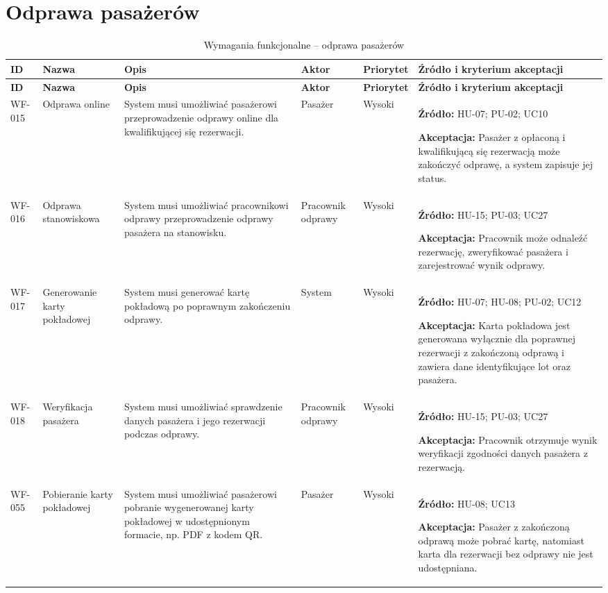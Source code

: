 \documentclass[12pt,a4paper,oneside]{report}
\begin{document}
\section{Odprawa pasażerów}
\small
\begin{longtable}{|p{1.05cm}|p{2.15cm}|p{3.35cm}|p{1.75cm}|p{0.95cm}|p{4.05cm}|}
\caption{Wymagania funkcjonalne -- odprawa pasażerów}\\\hline
\rowcolor{lightblue}\textbf{ID} & \textbf{Nazwa} & \textbf{Opis} & \textbf{Aktor} & \textbf{Priorytet} & \textbf{Źródło i kryterium akceptacji}\\\hline
\endfirsthead
\hline
\rowcolor{lightblue}\textbf{ID} & \textbf{Nazwa} & \textbf{Opis} & \textbf{Aktor} & \textbf{Priorytet} & \textbf{Źródło i kryterium akceptacji}\\\hline
\endhead
WF-015 & Odprawa online & System musi umożliwiać pasażerowi przeprowadzenie odprawy online dla kwalifikującej się rezerwacji. & Pasażer & Wysoki & \textbf{Źródło:} HU-07; PU-02; UC10\par\textbf{Akceptacja:} Pasażer z opłaconą i kwalifikującą się rezerwacją może zakończyć odprawę, a system zapisuje jej status.\\\hline
WF-016 & Odprawa stanowiskowa & System musi umożliwiać pracownikowi odprawy przeprowadzenie odprawy pasażera na stanowisku. & Pracownik odprawy & Wysoki & \textbf{Źródło:} HU-15; PU-03; UC27\par\textbf{Akceptacja:} Pracownik może odnaleźć rezerwację, zweryfikować pasażera i zarejestrować wynik odprawy.\\\hline
WF-017 & Generowanie karty pokładowej & System musi generować kartę pokładową po poprawnym zakończeniu odprawy. & System & Wysoki & \textbf{Źródło:} HU-07; HU-08; PU-02; UC12\par\textbf{Akceptacja:} Karta pokładowa jest generowana wyłącznie dla poprawnej rezerwacji z zakończoną odprawą i zawiera dane identyfikujące lot oraz pasażera.\\\hline
WF-018 & Weryfikacja pasażera & System musi umożliwiać sprawdzenie danych pasażera i jego rezerwacji podczas odprawy. & Pracownik odprawy & Wysoki & \textbf{Źródło:} HU-15; PU-03; UC27\par\textbf{Akceptacja:} Pracownik otrzymuje wynik weryfikacji zgodności danych pasażera z rezerwacją.\\\hline
WF-055 & Pobieranie karty pokładowej & System musi umożliwiać pasażerowi pobranie wygenerowanej karty pokładowej w udostępnionym formacie, np. PDF z kodem QR. & Pasażer & Wysoki & \textbf{Źródło:} HU-08; UC13\par\textbf{Akceptacja:} Pasażer z zakończoną odprawą może pobrać kartę, natomiast karta dla rezerwacji bez odprawy nie jest udostępniana.\\\hline
\end{longtable}
\normalsize
\end{document}
